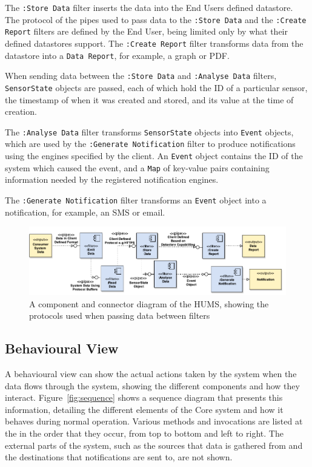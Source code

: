 \documentclass[10pt,a4paper]{article}
\begin{document}
The \texttt{:Store Data} filter inserts the data into the End Users defined datastore.
The protocol of the pipes used to pass data to the \texttt{:Store Data} and the \texttt{:Create Report} filters are defined by the End User, being limited only by what their defined datastores support.
The \texttt{:Create Report} filter transforms data from the datastore into a \texttt{Data Report}, for example, a graph or PDF.

When sending data between the \texttt{:Store Data} and \texttt{:Analyse Data} filters, \texttt{SensorState} objects are passed, each of which hold the ID of a particular sensor, the timestamp of when it was created and stored, and its value at the time of creation. 

The \texttt{:Analyse Data} filter transforms \texttt{SensorState} objects into \texttt{Event} objects, which are used by the \texttt{:Generate Notification} filter to produce notifications using the engines specified by the client.
An \texttt{Event} object contains the ID of the system which caused the event, and a \texttt{Map} of key-value pairs containing information needed by the registered notification engines.

The \texttt{:Generate Notification} filter transforms an \texttt{Event} object into a notification, for example, an SMS or email. 

\begin{figure}
  \includegraphics[width=\textwidth]{images/pipesAndFilters.pdf}
  \caption{A component and connector diagram of the HUMS, showing the protocols used when passing data between filters}
  \label{fig:pipesAndFilter}
\end{figure}

\subsection{Behavioural View}

A behavioural view can show the actual actions taken by the system when the data flows through the system, showing the different components and how they interact. Figure~\ref{fig:sequence} shows a sequence diagram that presents this information, detailing the different elements of the Core system and how it behaves during normal operation. Various methods and invocations are listed at the in the order that they occur, from top to bottom and left to right. The external parts of the system, such as the sources that data is gathered from and the destinations that notifications are sent to, are not shown.
\end{document}
